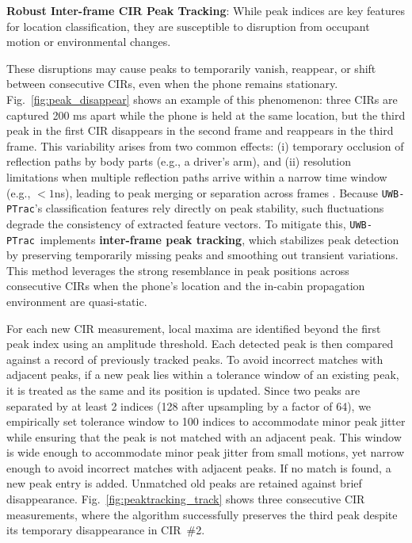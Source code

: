 \documentclass[sigconf]{acmart}
\newcommand{\edited}[1]{#1}
\newcommand{\name}{{{\tt UWB-PTrac}}}
\begin{document}
\textbf{Robust Inter-frame CIR Peak Tracking}:
%
 While peak indices are key features for location classification, they are susceptible to disruption from occupant motion or environmental changes.
%

%
These disruptions may cause peaks to temporarily vanish, reappear, or shift 
between consecutive CIRs, even when the phone remains stationary.
%
\edited{Fig.~\ref{fig:peak_disappear} shows an example of this phenomenon: 
three CIRs are captured 200 ms apart while the phone is held at the same 
location, but the third peak in the first CIR disappears in the second
frame and reappears in the third frame.}
%
This variability arises from two common effects: (i) temporary occlusion of 
reflection paths by body parts (e.g., a driver’s arm), and (ii) resolution 
limitations when multiple reflection paths arrive within a narrow time 
window (e.g., $<1$ns), leading to peak merging or separation across 
frames \cite{cao2024utrack3d}.
%
Because \name's classification features rely directly on peak stability, 
such fluctuations degrade the consistency of extracted feature vectors.
%
To mitigate this, \name\ implements \textbf{inter-frame peak tracking},
which stabilizes peak detection by preserving temporarily missing peaks 
and smoothing out transient variations. 
\edited{This method leverages the strong resemblance in peak positions 
across consecutive CIRs when the phone's location and the in-cabin 
propagation environment are quasi-static.}

For each new CIR measurement, local maxima are identified beyond the first 
peak index using an amplitude threshold.
%
Each detected peak is then compared against a record of previously tracked peaks. 
%
To avoid incorrect matches with adjacent peaks, if a new peak lies within a 
tolerance window of an existing peak, it is treated as the same and its position 
is updated. 
%
Since two peaks are separated by at least 2 indices (128 after 
upsampling by a factor of 64), we empirically set tolerance window to 
100 indices to accommodate minor peak jitter while ensuring that the peak 
is not matched with an adjacent peak. 
%
\edited{This window is wide enough to accommodate minor peak jitter from small motions, yet narrow enough to avoid incorrect matches with adjacent peaks.}
%
If no match is found, a new peak entry 
is added. Unmatched old peaks are retained against brief disappearance.
Fig.~\ref{fig:peaktracking_track} shows three consecutive CIR measurements, \edited{where the algorithm successfully preserves the third peak despite its temporary disappearance in CIR~\#2.}
\end{document}
